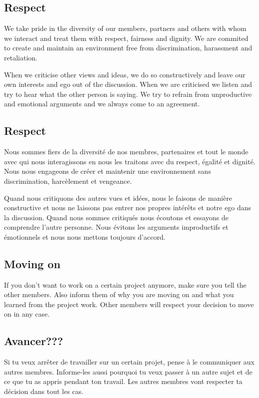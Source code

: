 \english
	\subsection{Respect}
 	We take pride in the diversity of our members, partners and others with whom we interact and treat them with respect, fairness and dignity. We are commited to create and maintain an environment free from discrimination, harassment and retaliation. 

 	When we criticise other views and ideas, we do so constructively and leave our own interests and ego out of the discussion. 
 	When we are criticised we listen and try to hear what the other person is saying. 
 	We try to refrain from unproductive and emotional arguments and we always come to an agreement.


\french
	\subsection{Respect}
	Nous sommes fiers de la diversité de nos membres, partenaires et tout le monde avec qui nous interagissons en nous les traitons avec du respect, égalité et dignité. Nous nous engageons de créer et maintenir une environnement sans discrimination, harcèlement et vengeance. 

	Quand nous critiquons des autres vues et idées, nous le faisons de manière constructive et nous ne laissons pas entrer nos propres intérêts et notre ego dans la discussion.
	Quand nous sommes critiqués nous écoutons et essayons de comprendre l'autre personne. 
	Nous évitons les arguments improductifs et émotionnels et nous nous mettons toujours d'accord.

\english
	\subsection{Moving on}
	If you don't want to work on a certain project anymore, make sure you tell the other members. Also inform them of why you are moving on and what you learned from the project work. Other members will respect your decision to move on in any case.

\french
	\subsection{Avancer???}
	Si tu veux arrêter de travailler sur un certain projet, pense à le communiquer aux autres membres. Informe-les aussi pourquoi tu veux passer à un autre sujet et de ce que tu as appris pendant ton travail. Les autres membres vont respecter ta décision dans tout les cas.

